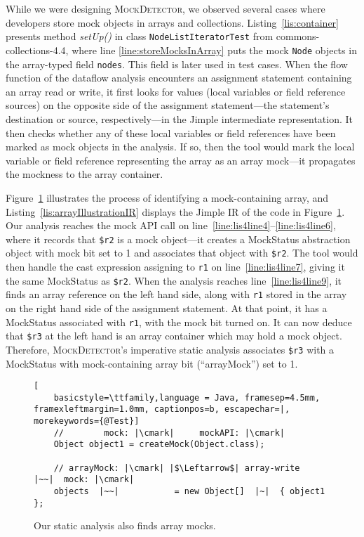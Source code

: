 While we were designing \textsc{MockDetector}, we observed several cases where developers store mock objects in arrays and collections. Listing~\ref{lis:container} presents method \textit{setUp()} in class \texttt{NodeListIteratorTest} from commons-collections-4.4, where line \ref{line:storeMocksInArray} puts the mock \texttt{Node} objects in the array-typed field \texttt{nodes}. This field is later used in test cases. When the flow function of the dataflow analysis encounters an assignment statement containing an array read or write, it first looks for values (local variables or field reference sources) on the opposite side of the assignment statement---the statement's destination or source, respectively---in the Jimple intermediate representation. It then checks whether any of these local variables or field references have been marked as mock objects in the analysis. If so, then the tool would mark the local variable or field reference representing the array as an array mock---it propagates the mockness to the array container.

Figure~\ref{fig:arrayMockIllustration} illustrates the process of identifying a mock-containing array, and Listing~\ref{lis:arrayIllustrationIR} displays the Jimple IR of the code in Figure~\ref{fig:arrayMockIllustration}. Our analysis reaches the mock API call on line~\ref{line:lis4line4}--\ref{line:lis4line6}, where it records that \texttt{\$r2} is a mock object---it creates a MockStatus abstraction object with mock bit set to 1 and associates that object with \texttt{\$r2}. The tool would then handle the cast expression assigning to \texttt{r1} on line~\ref{line:lis4line7}, giving it the same MockStatus as \texttt{\$r2}. When the analysis reaches line~\ref{line:lis4line9}, it finds an array reference on the left hand side, along with \texttt{r1} stored in the array on the right hand side of the assignment statement. At that point, it has a MockStatus associated with \texttt{r1}, with the mock bit turned on. It can now deduce that \texttt{\$r3} at the left hand is an array container which may hold a mock object. Therefore, \textsc{MockDetector}'s imperative static analysis associates \texttt{\$r3} with a MockStatus with mock-containing array bit (``arrayMock'') set to 1.


\begin{figure}
	\begin{lstlisting}[
	basicstyle=\ttfamily,language = Java, framesep=4.5mm, framexleftmargin=1.0mm, captionpos=b, escapechar=|, morekeywords={@Test}]
	//        mock: |\cmark|     mockAPI: |\cmark|
	Object object1 = createMock(Object.class);
	
	// arrayMock: |\cmark| |$\Leftarrow$| array-write    |~~|  mock: |\cmark|
	objects  |~~|           = new Object[]  |~|  { object1 };
	\end{lstlisting}
	
	\caption{Our static analysis also finds array mocks.}
	\label{fig:arrayMockIllustration}
	
\end{figure}

